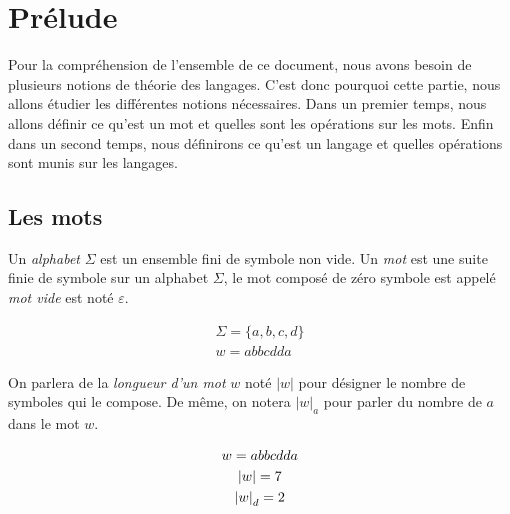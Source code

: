 \section{Prélude}

Pour la compréhension de l'ensemble de ce document, nous avons besoin de
plusieurs notions de théorie des langages. C'est donc pourquoi cette partie,
nous allons étudier les différentes notions nécessaires. Dans un premier temps,
nous allons définir ce qu'est un mot et quelles sont les opérations sur les
mots. Enfin dans un second temps, nous définirons ce qu'est un langage et
quelles opérations sont munis sur les langages.

\subsection{Les mots}

\begin{definition}
    Un \textit{alphabet} \(\Sigma\) est un ensemble fini de symbole non vide. Un
    \textit{mot} est une suite finie de symbole sur un alphabet \(\Sigma\), le mot
    composé de zéro symbole est appelé \textit{mot vide} est noté \(\varepsilon\).
\end{definition}

\begin{example}
    \begin{gather*}
        \Sigma = \{a, b, c, d\} \\
        w = abbcdda
    \end{gather*}
\end{example}

\begin{definition}
    On parlera de la \textit{longueur d'un mot} \(w\) noté \(|w|\) pour désigner le
    nombre de symboles qui le compose. De même, on notera \({|w|}_a\) pour parler
    du nombre de \(a\) dans le mot \(w\).
\end{definition}

\begin{example}
    \begin{gather*}
        w = abbcdda \notag \\
        |w| = 7 \\
        {|w|}_d = 2
    \end{gather*}
\end{example}

